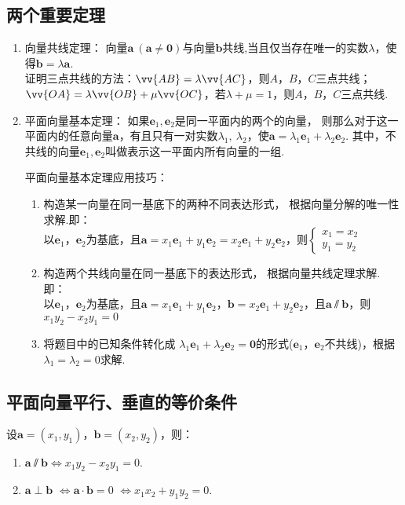   \subsection{两个重要定理}
    \begin{enumerate}[label=\arabic*)]
      \item 向量共线定理：
        向量$\bm{a}~(\bm{a}\ne\bm{0})$与向量$\bm{b}$共线,当且仅当存在唯一的实数$ \lambda $，使得$\bm{b}=\lambda\bm{a}$.\\
        {\kaishu
         证明三点共线的方法：$\vv{AB}=\lambda\vv{AC}$，则$A$，$B$，$C$三点共线；$\vv{OA}=\lambda\vv{OB}+\mu\vv{OC}$，若$\lambda+\mu=1$，则$A$，$B$，$C$三点共线.
        }
      \item 平面向量基本定理：
        如果$ \bm{e}_1,\bm{e}_2 $是同一平面内的两个的向量，
        则那么对于这一平面内的任意向量$ \bm{a} $，有且只有一对实数$ \lambda_1,~\lambda_2 $，使$\bm{a}=\lambda_1\bm{e}_1+\lambda_2\bm{e}_2$.
        其中，不共线的向量$\bm{e}_1, \bm{e}_2$叫做表示这一平面内所有向量的一组.\\
        {\kaishu 平面向量基本定理应用技巧：
          \begin{enumerate}[label=\circled{\arabic*}]
            \item 构造某一向量在同一基底下的两种不同表达形式，
              根据向量分解的唯一性求解.即：\\
              {\kaishu 以$\bm e_1$，$\bm e_2$为基底，且$\bm a=x_1\bm e_1+y_1\bm e_2=x_2\bm e_1+y_2\bm e_2$，则$\begin{cases}x_1=x_2\\y_1=y_2\end{cases}$}
            \item 构造两个共线向量在同一基底下的表达形式，
              根据向量共线定理求解.即：\\
              {\kaishu 以$\bm e_1$，$\bm e_2$为基底，且$\bm a=x_1\bm e_1+y_1\bm e_2$，$\bm b=x_2\bm e_1+y_2\bm e_2$，且$\bm a\varparallel\bm b$，则$x_1y_2-x_2y_1=0$}
            \item 将题目中的已知条件转化成
              $\lambda_1\bm e_1+\lambda_2\bm e_2=\bm 0$的形式($\bm e_1$，$\bm e_2$不共线)，根据$\lambda_1=\lambda_2=0$求解.
          \end{enumerate}}
    \end{enumerate}
  \subsection{平面向量平行、垂直的等价条件}
    设$\bm a=(x_1,y_1)$，$\bm b=(x_2,y_2)$，则：
    \begin{enumerate}[label=\arabic*)]
      \item $\bm a\varparallel\bm b$$\Leftrightarrow$$x_1y_2-x_2y_1=0$.
      \item $\bm a\perp\bm b$
            $\Leftrightarrow$$\bm a\cdot\bm b=0$
            $\Leftrightarrow$$x_1x_2+y_1y_2=0$.
    \end{enumerate}
